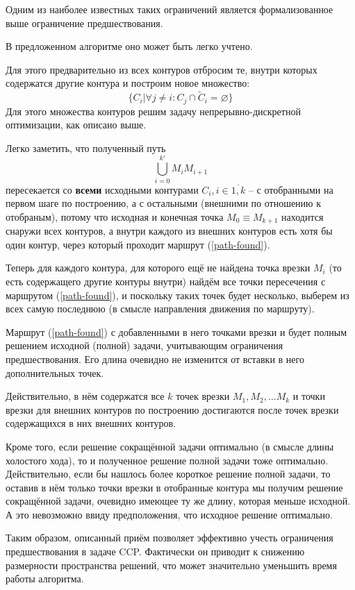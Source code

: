 \documentclass{article}
\begin{document}
Одним из наиболее известных таких
ограничений является формализованное выше
ограничение предшествования.

В предложенном алгоритме оно может быть
легко учтено.

Для этого предварительно из всех контуров отбросим
те, внутри которых содержатся другие контура и построим
новое множество:
$$
\big\{
    C_i | \forall j \ne i: C_j \cap \tilde C_i = \varnothing
\big\}
$$
Для этого множества контуров решим задачу 
непрерывно-дискретной оптимизации,
как описано выше.

Легко заметить, 
что полученный путь
\begin{equation}
    \bigcup_{i=0}^{k'} M_i M_{i+1} 
\label{path-found}
\end{equation}
пересекается со \textbf{всеми}
исходными контурами $C_i, i \in \overline{1,k}$ --
с отобранными на первом шаге по построению,
а с остальными
(внешними по отношению к отобраным),
потому что исходная и конечная точка
$M_0 \equiv M_{k+1}$
находится снаружи всех контуров,
а внутри каждого из внешних контуров
есть хотя бы один контур,
через который проходит маршрут
(\ref{path-found}).

Теперь для каждого контура,
для которого ещё не найдена точка врезки $M_i$
(то есть содержащего другие контуры внутри)
найдём все точки пересечения с маршрутом
(\ref{path-found}),
и поскольку таких точек будет несколько,
выберем из всех самую последнюю
(в смысле направления движения по маршруту).

Маршрут (\ref{path-found}) с добавленными
в него точками врезки и будет полным решением
исходной (полной) задачи,
учитывающим ограничения предшествования.
Его длина очевидно не изменится от вставки
в него дополнительных точек.

Действительно, в нём содержатся все $k$ точек врезки
$M_1, M_2, \dots M_k$
и точки врезки для внешних контуров
по построению достигаются
после точек врезки содержащихся в них внешних контуров.

Кроме того, если решение сокращённой задачи оптимально
(в смысле длины холостого хода),
то и полученное решение полной задачи тоже оптимально.
Действительно,
если бы нашлось более короткое решение полной задачи,
то оставив в нём только точки врезки в отобранные контура
мы получим решение сокращённой задачи,
очевидно имеющее ту же длину,
которая меньше исходной.
А это невозможно ввиду предположения,
что исходное решение оптимально.

Таким образом,
описанный приём позволяет
эффективно учесть ограничения
предшествования в задаче CCP.
Фактически он приводит
к снижению размерности пространства решений,
что может значительно уменьшить время работы алгоритма.
\end{document}
